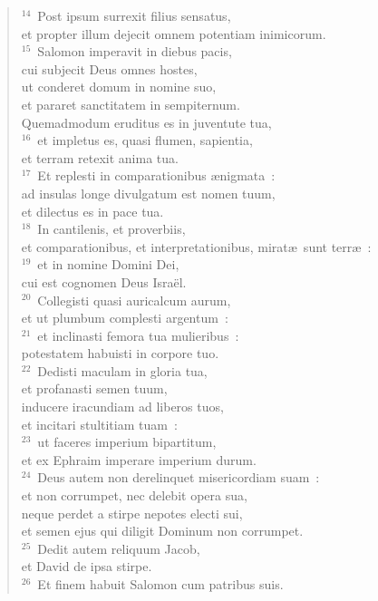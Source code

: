 \begin{verse}${}^{14}$~Post ipsum surrexit filius sensatus,\\ et propter illum dejecit omnem potentiam inimicorum.\\
${}^{15}$~Salomon imperavit in diebus pacis,\\ cui subjecit Deus omnes hostes,\\ ut conderet domum in nomine suo,\\ et pararet sanctitatem in sempiternum.\\ Quemadmodum eruditus es in juventute tua,\\
${}^{16}$~et impletus es, quasi flumen, sapientia,\\ et terram retexit anima tua.\\
${}^{17}$~Et replesti in comparationibus \ae nigmata~:\\ ad insulas longe divulgatum est nomen tuum,\\ et dilectus es in pace tua.\\
${}^{18}$~In cantilenis, et proverbiis,\\ et comparationibus, et interpretationibus, mirat\ae\ sunt terr\ae~:\\
${}^{19}$~et in nomine Domini Dei,\\ cui est cognomen Deus Isra\"el.\\
${}^{20}$~Collegisti quasi auricalcum aurum,\\ et ut plumbum complesti argentum~:\\
${}^{21}$~et inclinasti femora tua mulieribus~:\\ potestatem habuisti in corpore tuo.\\
${}^{22}$~Dedisti maculam in gloria tua,\\ et profanasti semen tuum,\\ inducere iracundiam ad liberos tuos,\\ et incitari stultitiam tuam~:\\
${}^{23}$~ut faceres imperium bipartitum,\\ et ex Ephraim imperare imperium durum.\\
${}^{24}$~Deus autem non derelinquet misericordiam suam~:\\ et non corrumpet, nec delebit opera sua,\\ neque perdet a stirpe nepotes electi sui,\\ et semen ejus qui diligit Dominum non corrumpet.\\
${}^{25}$~Dedit autem reliquum Jacob,\\ et David de ipsa stirpe.\\
${}^{26}$~Et finem habuit Salomon cum patribus suis.\end{verse}


